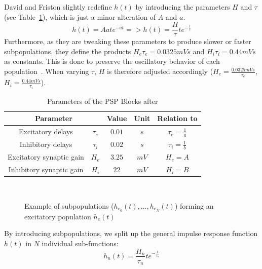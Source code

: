 David and Friston slightly redefine $h(t)$ by introducing the
parameters $H$ and $\tau$ (see Table~\ref{tab:davidfriston}),
which is just a minor alteration of $A$ and $a$.
\[ h(t)=Aate^{-at} => h(t)=\frac{H}{\tau}te^{-\frac{1}{\tau}} \]
Furthermore, as they are tweaking these parameters to produce slower or faster subpopulations,
they define the products $H_e\tau_e=0.0325mVs$ and $H_i\tau_i=0.44mVs$ as constants.
This is done to preserve the oscillatory behavior of each population~\parencite{david_neural_2003}.
When varying $\tau$, $H$ is therefore adjusted
accordingly ($H_e=\frac{0.0325mVs}{\tau_e}$, $H_i=\frac{0.44mVs}{\tau_i}$).
\begin{table}[H]
    \centering
    \begin{tabular}{ |c|c|c|c|c| }
        \hline
        \multicolumn{2}{|c|}{Parameter} & Value & Unit & Relation to \parencite{jansen_electroencephalogram_1995} \\
        \hline
        \hline
        \rule{0pt}{3ex}Excitatory delays        & \(\tau_e\) & \(0.01\) & $s$  & $ \tau_e = \frac{1}{a} $ \\[1.2ex]
        \hline
        \rule{0pt}{3ex}Inhibitory delays        & \(\tau_i\) & \(0.02\) & $s$  & $ \tau_i = \frac{1}{b} $\\[1.2ex]
        \hline
        \rule{0pt}{3ex}Excitatory synaptic gain & \(H_e\)    & \(3.25\) & $mV$ & $ H_e = A $ \\[1.2ex]
        \hline
        \rule{0pt}{3ex}Inhibitory synaptic gain & \(H_i\)    & \(22\)   & $mV$ & $ H_i = B $ \\[1.2ex]
        \hline
    \end{tabular}
    \caption{Parameters of the PSP Blocks after \parencite{david_neural_2003}}
    \label{tab:davidfriston}
\end{table}
 \\[2em]
\begin{figure}[H]
    
    \caption{Example of subpopulations ($h_{e_0}(t), \dots, h_{e_N}(t)$) forming an excitatory population $h_e(t)$}
    \label{fig:exc_subpops}
\end{figure}
By introducing subpopulations, we split up the general impulse response function $h(t)$ in $N$ individual
sub-functions:
\[h_n(t) = \frac{H_n}{\tau_n}te^{-\frac{1}{\tau_n}}\] \\[1em]

